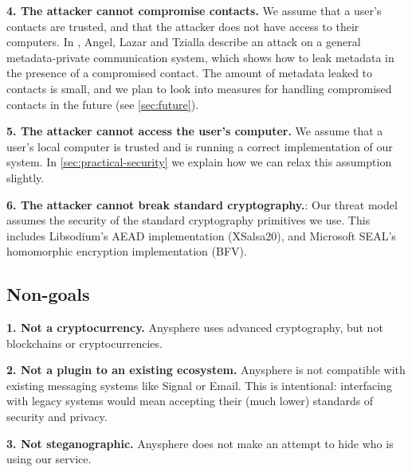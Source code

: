 \textbf{4. The attacker cannot compromise contacts.} We assume that a user's contacts are trusted, and that the attacker does not have access to their computers. In \cite{angel2018s}, Angel, Lazar and Tzialla describe an attack on a general metadata-private communication system, which shows how to leak metadata in the presence of a compromised contact. The amount of metadata leaked to contacts is small, and we plan to look into measures for handling compromised contacts in the future (see \cref{sec:future}).

\textbf{5. The attacker cannot access the user's computer.} We assume that a user's local computer is trusted and is running a correct implementation of our system. In \cref{sec:practical-security} we explain how we can relax this assumption slightly.

\textbf{6. The attacker cannot break standard cryptography.}: Our threat model assumes the security of the standard cryptography primitives we use. This includes Libsodium's AEAD implementation (XSalsa20), and Microsoft SEAL's homomorphic encryption implementation (BFV).

\subsection{Non-goals}
\textbf{1. Not a cryptocurrency.} Anysphere uses advanced cryptography, but not blockchains or cryptocurrencies.

\textbf{2. Not a plugin to an existing ecosystem.} Anysphere is not compatible with existing messaging systems like Signal or Email. This is intentional: interfacing with legacy systems would mean accepting their (much lower) standards of security and privacy.

\textbf{3. Not steganographic.} Anysphere does not make an attempt to hide who is using our service.


